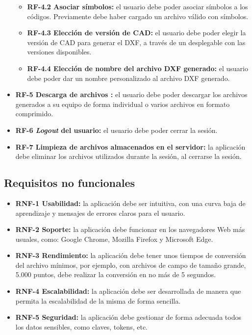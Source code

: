 \begin{itemize}
\begin{itemize}
\item \textbf{RF-4.2 Asociar símbolos: }el usuario debe poder asociar símbolos a los códigos. Previamente debe haber cargado un archivo válido con símbolos. 

\item \textbf{RF-4.3 Elección de versión de CAD: }el usuario debe poder elegir la versión de CAD para generar el DXF, a través de un desplegable con las versiones disponibles.

\item \textbf{RF-4.4 Elección de nombre del archivo DXF generado: }el usuario debe poder dar un nombre personalizado al archivo DXF generado.

\end{itemize}

\item \textbf{RF-5 Descarga de archivos :} el usuario debe poder descargar los archivos generados a su equipo de forma individual o varios archivos en formato comprimido.


\item \textbf{RF-6 \emph{Logout} del usuario: }el usuario debe poder cerrar la sesión.

\item \textbf{RF-7 Limpieza de archivos almacenados en el servidor: }la aplicación debe eliminar los archivos utilizados durante la sesión, al cerrarse la sesión.

\end{itemize}



\subsection{Requisitos no funcionales}

\begin{itemize}
\item \textbf{RNF-1 Usabilidad: }la aplicación debe ser intuitiva, con una curva baja de aprendizaje y mensajes de errores claros para el usuario.

\item \textbf{RNF-2 Soporte: }la aplicación debe funcionar en los navegadores Web más usuales, como: Google Chrome, Mozilla Firefox y Microsoft Edge.

\item \textbf{RNF-3 Rendimiento: }la aplicación debe tener unos tiempos de conversión del archivo mínimos, por ejemplo, con archivos de campo de tamaño grande, 5.000 puntos, debe realizar la conversión en no más de 5 segundos.

\item \textbf{RNF-4 Escalabilidad: }la aplicación debe ser desarrollada de manera que permita la escalabilidad de la misma de forma sencilla.

\item \textbf{RNF-5 Seguridad:} la aplicación debe gestionar de forma adecuada todos los datos sensibles, como claves, tokens, etc.

\end{itemize}

